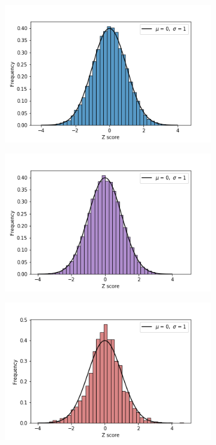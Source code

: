 \begin{figure}[h!]
     \centering
     \begin{subfigure}[b]{0.3\textwidth}
         \centering
         \includegraphics[width=\textwidth]{img/zscoreCNV.png}
         \caption{}
     \end{subfigure}
     \hfill
     \begin{subfigure}[b]{0.3\textwidth}
         \centering
         \includegraphics[width=\textwidth]{img/zscoreRNA.png}
         \caption{}
     \end{subfigure}
     \hfill
     \begin{subfigure}[b]{0.3\textwidth}
         \centering
         \includegraphics[width=\textwidth]{img/zscoreMIRNA.png}

\end{subfigure}
\end{figure}
